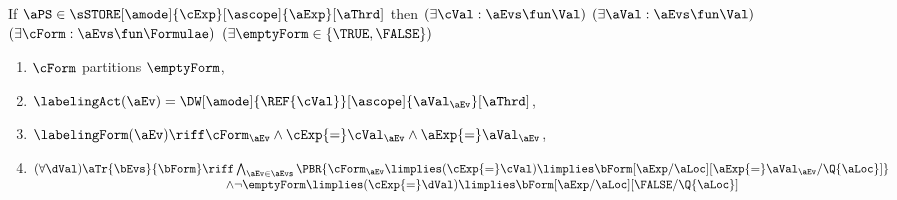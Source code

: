 \begin{definition}
  \label{def:semcaaddr}

  \noindent
  If $\aPS \in \sSTORE[\amode]{\cExp}[\ascope]{\aExp}[\aThrd]$ then
  $(\exists\cVal:\aEvs\fun\Val)$
  $(\exists\aVal:\aEvs\fun\Val)$
  $(\exists\cForm:\aEvs\fun\Formulae)$
  $(\exists\emptyForm\in\{\TRUE,\FALSE\})$
  \begin{multicols}{2}
    \begin{enumerate}[topsep=0pt,label=(\textsc{w}\arabic*),ref=\textsc{w}\arabic*]
    \item \label{write-E-ca-addr}
      $\cForm$ partitions $\emptyForm$,
    \item \label{write-lambda-ca-addr}
      $\labelingAct(\aEv) = \DW[\amode]{\REF{\cVal}}[\ascope]{\aVal_\aEv}[\aThrd]$,
    \item \label{write-kappa-ca-addr}
      \begin{math}
        \labelingForm(\aEv) \riff
        \cForm_\aEv
        \land \cExp{=}\cVal_\aEv
        \land \aExp{=}\aVal_\aEv
      \end{math},      
    \item
    \begin{math}
      (\forall\dVal)
      \begin{aligned}[t]
        \aTr{\bEvs}{\bForm} \riff
        &\textstyle\bigwedge_{\aEv\in\aEvs}
        \PBR{
          \cForm_\aEv
          \limplies (\cExp{=}\cVal)
          \limplies 
          \bForm[\aExp/\aLoc][\aExp{=}\aVal_\aEv/\Q{\aLoc}]
        }
        \\[-.5ex]
        \land
        &
        \lnot\emptyForm
        \limplies (\cExp{=}\dVal)
        \limplies 
        \bForm[\aExp/\aLoc][\FALSE/\Q{\aLoc}]
      \end{aligned}
    \end{math}
    \columnbreak

\end{enumerate}
\end{multicols}
\end{definition}
